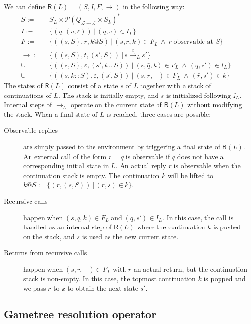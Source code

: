 \documentclass[11pt]{article}
\newcommand{\kw}[1]{{\mathsf{#1}}}
\begin{document}
We can define $\kw{R}(L) = (S, I, F, {\rightarrow})$ in the following way:
\begin{align*}
  S := &\: S_L \times \mathcal{P}(Q_{\mathcal{L} \multimap \mathcal{L}} \times S_L)^* \\
  I := &\: \{ (q, (s, \varepsilon)) \: \vert \: (q, s) \in I_L \} \\
  F := &\: \{ ((s, S), r, k@S) \: \vert \:
           (s, r, k) \in F_L \: \wedge \: r \mbox{ observable at } S \} \\
  {\rightarrow} := &\: \{ ((s, S), t, (s', S)) \: \vert \: s \stackrel{t}{\longrightarrow}_L s' \} \\
    \cup &\: \{ ((s, S), \varepsilon, (s', k::S)) \: \vert \:
        (s, \bar{q}, k) \in F_L \: \wedge \:
        (q, s') \in I_L \} \\
    \cup &\: \{ ((s, k::S), \varepsilon, (s', S)) \: \vert \:
        (s, r, -) \in F_L \: \wedge \:
        (\bar{r}, s') \in k \}
\end{align*}
The states of $\kw{R}(L)$
consist of a state $s$ of $L$ together with a stack of continuations of $L$.
The stack is initially empty,
and $s$ is initialized following $I_L$.
Internal steps of $\rightarrow_L$ operate on the current state of $\kw{R}(L)$
without modifying the stack.
When a final state of $L$ is reached, three cases are possible:
\begin{description}
\item[Observable replies] are simply passed to the environment
  by triggering a final state of $\kw{R}(L)$.
  An external call of the form $r = \bar{q}$ is observable
  if $q$ does not have a corresponding initial state in $L$.
  An actual reply $r$ is observable when the continuation stack is empty.
  The continuation $k$ will be lifted to
  $k@S := \{ (r, (s, S)) \: \vert \: (r, s) \in k \}$.
\item[Recursive calls] happen when
  $(s, \bar{q}, k) \in F_L$ and $(q, s') \in I_L$.
  In this case, the call is handled as an internal step of $\kw{R}(L)$
  where the continuation $k$ is pushed on the stack,
  and $s$ is used as the new current state.
\item[Returns from recursive calls] happen when $(s, r, -) \in F_L$
  with $r$ an actual return, but the continuation stack is non-empty.
  In this case, the topmost continuation $k$ is popped
  and we pass $r$ to $k$ to obtain the next state $s'$.
\end{description}

\subsection{Gametree resolution operator}
\label{sec:res}
\end{document}
